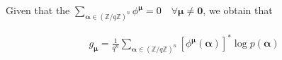 \noindent
Given that the $\sum_{\boldsymbol{\alpha} \in {(\mathbb{Z}/q\mathbb{Z})}^n} \phi^{\boldsymbol{\mu}} = 0 \quad \forall \boldsymbol{\mu} \neq \mathbf{0}$, we obtain that

\begin{align*}
    g_{\boldsymbol{\mu}} = \frac{1}{q^n}  \sum_{\boldsymbol{\alpha} \in {(\mathbb{Z}/q\mathbb{Z})}^n} \left[\phi^{\boldsymbol{\mu}}(\boldsymbol{\alpha})\right]^* \log p(\boldsymbol{\alpha})
\end{align*}
